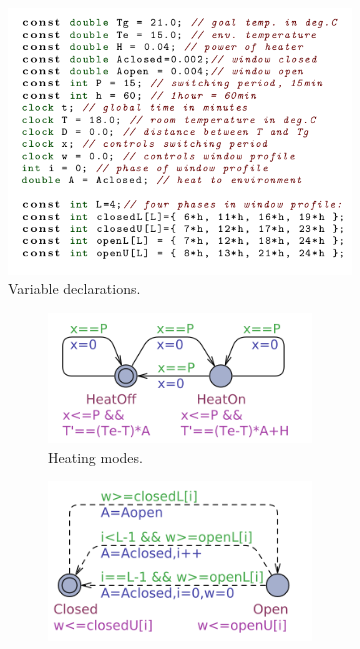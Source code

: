     \begin{figure}[!htb]
      \begin{subfigure}{0.60\textwidth}
        \centering
        \includegraphics[width=\linewidth]{images/oneroom1.png}
        \caption{Variable declarations.} \label{fig:1a}
      \end{subfigure}
      \hspace*{\fill}
      \begin{subfigure}{0.35\textwidth}
          \begin{subfigure}{\textwidth}
            \includegraphics[width=\linewidth]{images/heatingmodes.png}
            \caption{Heating modes.} \label{fig:1b}
          \end{subfigure}
          \begin{subfigure}{\textwidth}
            \includegraphics[width=\linewidth]{images/windowprofile.png}

\end{subfigure}
\end{subfigure}
\end{figure}
